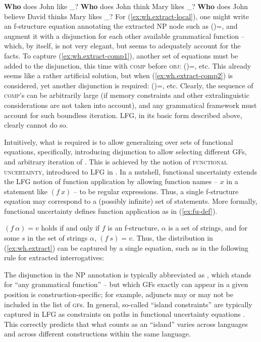 \documentclass[output=paper,hidelinks]{langscibook}
\begin{document}
 \ea\label{ex:wh.extract}
    \ea\label{ex:wh.extract-local} \textbf{Who} does John like \_?
    \ex\label{ex:wh.extract-comp1} \textbf{Who} does John think Mary likes \_?
    \ex\label{ex:wh.extract-comp2} \textbf{Who} does John believe David thinks Mary likes \_?
    \z
 \z
For (\ref{ex:wh.extract-local}), one might write an f-structure equation annotating the extracted NP node such as (\UP\OBJ)=\DOWN, and augment it with a disjunction for each other available grammatical function -- which, by itself, is not very elegant, but seems to adequately account for the facts. To capture (\ref{ex:wh.extract-comp1}), another set of equations must be added to the disjunction, this time with \textsc{comp} before \textsc{obj}: (\UP\COMP\OBJ)=\DOWN, etc. This already seems like a rather artificial solution, but when (\ref{ex:wh.extract-comp2}) is considered, yet another disjunction is required: (\UP\COMP\COMP\OBJ)=\DOWN, etc. Clearly, the sequence of \textsc{comp}'s can be arbitrarily large (if memory constraints and other extralinguistic considerations are not taken into account), and any grammatical framework must account for such boundless iteration. LFG, in its basic form described above, clearly cannot do so.
 
 Intuitively, what is required is to allow generalizing over sets of functional equations, specifically, introducing disjunction to allow selecting different GFs, and arbitrary iteration of \COMP. This is achieved by the notion of \textsc{functional uncertainty}, introduced to LFG in \textcite{kaplzaen89}. In a nutshell, functional uncertainty extends the LFG notion of function application by allowing function names -- $x$ in a statement like $(f~x)$ -- to be regular expressions. Thus, a single f-structure equation may correspond to a (possibly infinite) set of statements. More formally, functional uncertainty defines function application as in  (\ref{ex:fu-def}).
 
 \ea\label{ex:fu-def}%
 $(f \: \alpha) = v$ holds if and only if $f$ is an f-structure, $\alpha$ is a set of strings, and for some $s$ in the set of strings $\alpha$, $(f \: s) = v$.
 \z
Thus, the distribution in (\ref{ex:wh.extract}) can be captured by a single equation, such as in the following rule for extracted interrogatives:
 
 \ea
 \z
The disjunction in the NP annotation is typically abbreviated as \GF, which stands for ``any grammatical function'' -- but which GFs exactly can appear in a given position is construction-specific; for example, adjuncts may or may not be included in the list of \textsc{gf}s. In general, so-called ``island constraints'' are typically captured in LFG as constraints on paths in functional uncertainty equations \parencite{kaplzaen89}. This correctly predicts that what counts as an ``island'' varies across languages and across different constructions within the same language.
  
\end{document}
